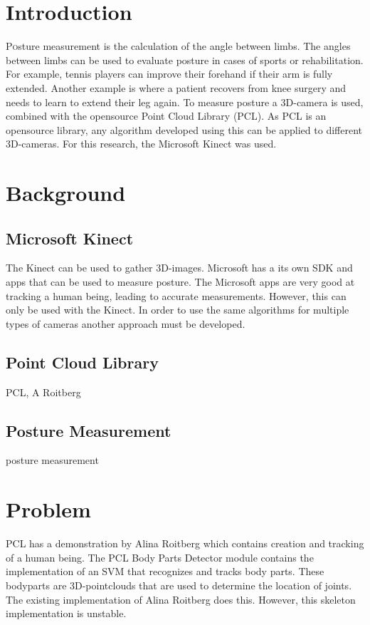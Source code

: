 \documentclass[twoside]{article}
\begin{document}
\begin{multicols}{2} %

\section{Introduction}

\lettrine[nindent=0em,lines=3]{P}osture measurement is the calculation of the angle between limbs. The angles between limbs can be used to evaluate posture in cases of sports or rehabilitation. For example, tennis players can improve their forehand if their arm is fully extended. Another example is where a patient recovers from knee surgery and needs to learn to extend their leg again. To measure posture a 3D-camera is used, combined with the opensource Point Cloud Library (PCL). As PCL is an opensource library, any algorithm developed using this can be applied to different 3D-cameras. For this research, the Microsoft Kinect was used.


\section{Background}
\subsection{Microsoft Kinect}
The Kinect can be used to gather 3D-images. Microsoft has a its own SDK and apps that can be used to measure posture. The Microsoft apps are very good at tracking a human being, leading to accurate measurements. However, this can only be used with the Kinect. In order to use the same algorithms for multiple types of cameras another approach must be developed.

\subsection{Point Cloud Library}
PCL, A Roitberg 

\subsection{Posture Measurement}
posture measurement


\section{Problem}
PCL has a demonstration by Alina Roitberg which contains creation and tracking of a human being. The PCL Body Parts Detector module contains the implementation of an SVM that recognizes and tracks body parts. These bodyparts are 3D-pointclouds that are used to determine the location of joints. The existing implementation of Alina Roitberg does this. However, this skeleton implementation is unstable.


\end{multicols}
\end{document}
